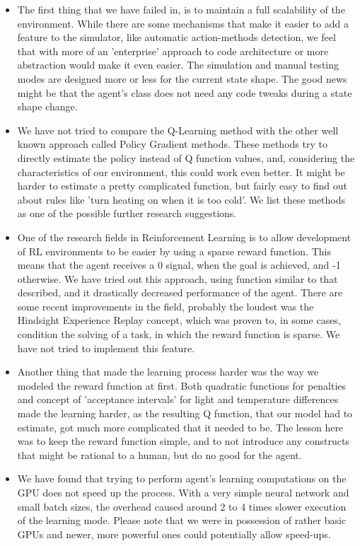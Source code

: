 \documentclass{article}
\begin{document}
\begin{itemize}
\item The first thing that we have failed in, is to maintain a full scalability of the environment. While there are some mechanisms that make it easier to add a feature to the simulator, like automatic action-methods detection, we feel that with more of an 'enterprise' approach to code architecture or more abstraction would make it even easier. The simulation and manual testing modes are designed more or less for the current state shape. The good news might be that the agent's class does not need any code tweaks during a state shape change.

\item We have not tried to compare the Q-Learning method with the other well known approach called Policy Gradient methods. These methods try to directly estimate the policy instead of Q function values, and, considering the characteristics of our environment, this could work even better. It might be harder to estimate a pretty complicated function, but fairly easy to find out about rules like 'turn heating on when it is too cold'. We list these methods as one of the possible further research suggestions.

\item One of the research fields in Reinforcement Learning is to allow development of RL environments to be easier by using a sparse reward function. This means that the agent receives a 0 signal, when the goal is achieved, and -1 otherwise. We have tried out this approach, using function similar to that described, and it drastically decreased performance of the agent. There are some recent improvements in the field, probably the loudest was the Hindsight Experience Replay concept, which was proven to, in some cases, condition the solving of a task, in which the reward function is sparse. We have not tried to implement this feature.

\item Another thing that made the learning process harder was the way we modeled the reward function at first. Both quadratic functions for penalties and concept of 'acceptance intervals' for light and temperature differences made the learning harder, as the resulting Q function, that our model had to estimate, got much more complicated that it needed to be. The lesson here was to keep the reward function simple, and to not introduce any constructs that might be rational to a human, but do no good for the agent. 

\item We have found that trying to perform agent's learning computations on the GPU does not speed up the process. With a very simple neural network and small batch sizes, the overhead caused around 2 to 4 times slower execution of the learning mode. Please note that we were in possession of rather basic GPUs and newer, more powerful ones could potentially allow speed-ups.


\end{itemize}
\end{document}
